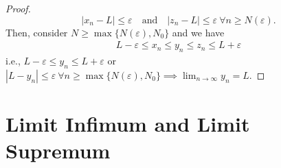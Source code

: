\documentclass{article}
\newcommand{\mylim}[2]{\lim_{#1 \to #2}}
\newcommand{\?}{\stackrel{?}{=}}
\begin{document}
\begin{itemize}
\begin{proof}
            $$|x_n - L| \leq \varepsilon \quad \text{and} \quad |z_n - L| \leq \varepsilon \ \forall n \geq N(\varepsilon).$$
            Then, consider $N \geq \max\{N(\varepsilon), N_0\}$ and we have
            \begin{align*}
                L - \varepsilon \leq x_n \leq y_n \leq z_n \leq L + \varepsilon
            \end{align*}
            i.e., $L - \varepsilon \leq y_n \leq L + \varepsilon$ or $|L - y_n| \leq \varepsilon \ \forall n \geq \max\{N(\varepsilon), N_0\} \implies \mylim{n}{\infty} y_n = L$.
        \end{proof}
\end{itemize}

\section*{Limit Infimum and Limit Supremum}
\end{document}
